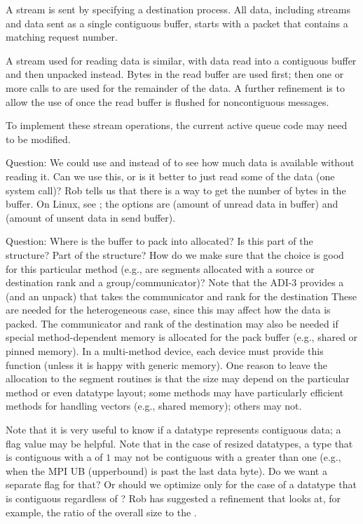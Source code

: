\begin{enumerate}
    A stream is sent by specifying a destination process.  All data, including
    streams and data sent as a single contiguous buffer, 
    starts with a  packet that contains a
    matching request number.

    A stream used for reading data is similar, with data read into a
    contiguous buffer and then unpacked instead.  Bytes in
    the read buffer are used first; then one or more calls to  are
    used for the remainder of the data.  A further refinement is to allow the
    use of  once the read buffer is flushed for
    noncontiguous messages.  

    To implement these stream operations, the current active queue code may
    need to be modified.

    Question: We could use  and  instead of
     to see how much data is available without reading it.  Can we
    use this, or is it better to just read some of the data (one system call)?
    Rob tells us that there is a way to get the number of bytes in the
    buffer.  On Linux, see ; the  options
    are  (amount of unread data in buffer) and
     (amount of unsent data in send buffer).


  Question: Where is the buffer to pack into allocated?  Is this part of the 
   structure?  Part of the 
  structure? How do we make sure that the choice is
  good for this particular method (e.g., are segments allocated with a source
  or destination rank and a group/communicator)?  Note that the ADI-3 provides
  a  (and an unpack) that takes the
  communicator and rank for the destination These are needed for the
  heterogeneous case, since this may affect how the data is
  packed. The communicator and rank of the destination may also be
  needed if special method-dependent memory is allocated for the pack
  buffer (e.g., shared or pinned memory). In a multi-method device, each
  device must provide this function (unless it is happy with generic
  memory).
  One reason to leave the allocation to the segment routines is that
  the size may depend on the particular method or even datatype
  layout; some methods may have particularly efficient methods for
  handling vectors (e.g., shared memory); others may not.  

  Note that it is very useful to know if a datatype represents contiguous
  data; a  flag value may be helpful.  Note
  that in the case of resized datatypes, a type that is contiguous with a
   of $1$ may not be contiguous with a  greater than
  one (e.g., when the MPI UB (upperbound) is past the last data byte).  Do we
  want a separate flag for that?  Or should we optimize only for 
  the case of a datatype that is contiguous regardless of
  ?  Rob has suggested a refinement that looks at, for
  example, the ratio of the overall size to the .


\end{enumerate}

